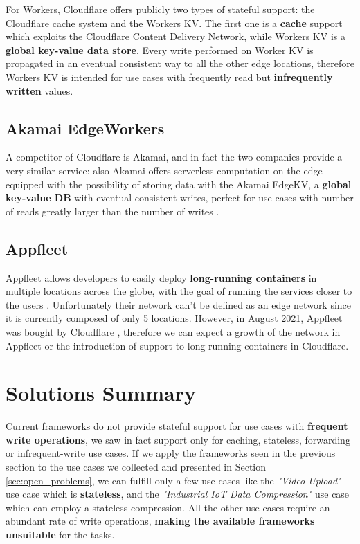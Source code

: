 For Workers, Cloudflare offers publicly two types of stateful support: the Cloudflare cache system and the Workers KV. The first one is a \textbf{cache} support which exploits the Cloudflare Content Delivery Network, while Workers KV is a \textbf{global key-value data store}. Every write performed on Worker KV is propagated in an eventual consistent way to all the other edge locations, therefore Workers KV is intended for use cases with frequently read but \textbf{infrequently written} values.


\subsection{Akamai EdgeWorkers}
A competitor of Cloudflare is Akamai, and in fact the two companies provide a very similar service: also Akamai offers serverless computation on the edge equipped with the possibility of storing data with the Akamai EdgeKV, a \textbf{global key-value DB} with eventual consistent writes, perfect for use cases with number of reads greatly larger than the number of writes \cite{akamai-edge-workers}.


\subsection{Appfleet}
Appfleet allows developers to easily deploy \textbf{long-running containers} in multiple locations across the globe, with the goal of running the services closer to the users \cite{appfleet}. Unfortunately their network can't be defined as an edge network since it is currently composed of only 5 locations. However, in August 2021, Appfleet was bought by Cloudflare \cite{appfleet-cloudflare}, therefore we can expect a growth of the network in Appfleet or the introduction of support to long-running containers in Cloudflare.


\section{Solutions Summary}
Current frameworks do not provide stateful support for use cases with \textbf{frequent write operations}, we saw in fact support only for caching, stateless, forwarding or infrequent-write use cases.
If we apply the frameworks seen in the previous section to the use cases we collected and presented in Section \ref{sec:open_problems}, we can fulfill only a few use cases like the \textit{"Video Upload"} use case which is \textbf{stateless}, and the \textit{"Industrial IoT Data Compression"} use case which can employ a stateless compression. All the other use cases require an abundant rate of write operations, \textbf{making the available frameworks unsuitable} for the tasks.

